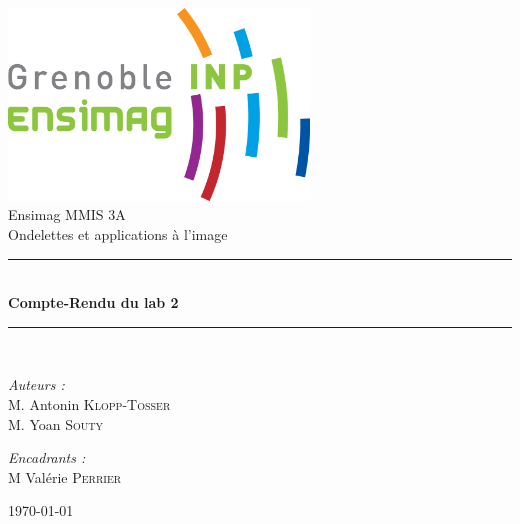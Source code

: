 \documentclass[a4paper,12pt, openany]{book}
\theoremstyle{break}
\begin{document}

\begin{titlepage}
\begin{center}

\includegraphics[width=0.6\textwidth]{ensimag_logo.png}\\[1cm]

{\large Ensimag MMIS 3A}\\[0.5cm]

{\large Ondelettes et applications à l'image}\\[0.5cm]

\rule{\linewidth}{0.5mm} \\[0.4cm]
{ \huge \bfseries Compte-Rendu du lab 2\\[0.4cm] }
\rule{\linewidth}{0.5mm} \\[1.5cm]

\noindent
\begin{minipage}{0.4\textwidth}
  \begin{flushleft} \large
    \emph{Auteurs :}\\
    M. Antonin \textsc{Klopp-Tosser} \\
    M. Yoan \textsc{Souty} \\
  \end{flushleft}
\end{minipage}%
\begin{minipage}{0.4\textwidth}
  \begin{flushright} \large
    \emph{Encadrants :} \\
    M Valérie \textsc{Perrier} \\

  \end{flushright}
\end{minipage}

\vfill

{\large \today}

\end{center}
\end{titlepage}
\end{document}
